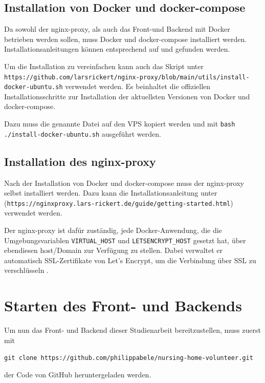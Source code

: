 \subsection{Installation von Docker und docker-compose}
Da sowohl der nginx-proxy, als auch das Front-und Backend mit Docker betrieben werden sollen, muss Docker und docker-compose installiert werden. Installationsanleitungen können entsprechend auf \cite{DockerInstallation} und \cite{DockerDomposeInstallation} gefunden werden.

Um die Installation zu vereinfachen kann auch das Skript unter \lstinline{https://github.com/larsrickert/nginx-proxy/blob/main/utils/install-docker-ubuntu.sh} verwendet werden. Es beinhaltet die offiziellen Installationsschritte zur Installation der aktuellsten Versionen von Docker und docker-compose.

Dazu muss die genannte Datei auf den \ac{VPS} kopiert werden und mit \lstinline{bash ./install-docker-ubuntu.sh} ausgeführt werden.

\subsection{Installation des nginx-proxy}
Nach der Installation von Docker und docker-compose muss der nginx-proxy selbst installiert werden. Dazu kann die Installationsanleitung unter \cite{NginxProxyInstallation} (\lstinline{https://nginxproxy.lars-rickert.de/guide/getting-started.html}) verwendet werden.

Der nginx-proxy ist dafür zuständig, jede Docker-Anwendung, die die Umgebungsvariablen \lstinline{VIRTUAL_HOST} und \lstinline{LETSENCRYPT_HOST} gesetzt hat, über ebendiesen host/Domain zur Verfügung zu stellen. Dabei verwaltet er automatisch SSL-Zertifikate von Let's Encrypt, um die Verbindung über SSL zu verschlüsseln \cite{NginxProxyInstallation}.

\section{Starten des Front- und Backends}
\label{sec:start-applications}
Um nun das Front- und Backend dieser Studienarbeit bereitzustellen, muss zuerst mit

\begin{center}
  \lstinline{git clone https://github.com/philippabele/nursing-home-volunteer.git}
\end{center}

der Code von GitHub heruntergeladen werden.

